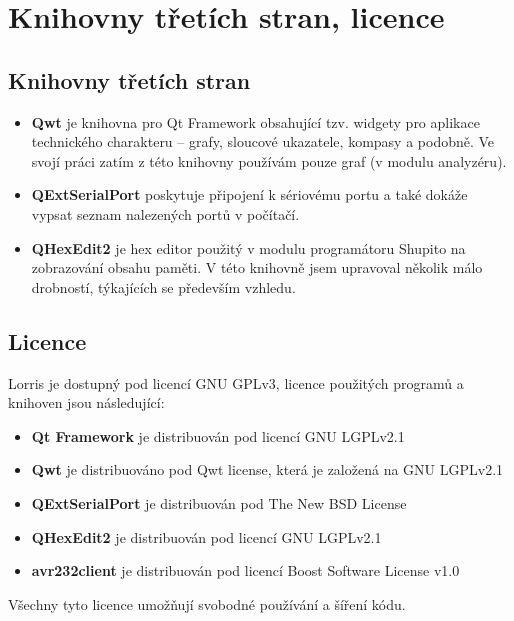 \documentclass[12pt, a4paper, oneside]{article}
\begin{document}
\newpage
\section{Knihovny třetích stran, licence}
\subsection{Knihovny třetích stran}
\begin{itemize}
    \item {\bf Qwt}\cite{qwt} je knihovna pro Qt Framework obsahující tzv. widgety pro aplikace technického charakteru -- grafy, sloucové ukazatele, kompasy a podobně. Ve svojí práci zatím z této knihovny používám pouze graf (v modulu analyzéru).
    \item {\bf QExtSerialPort}\cite{qext} poskytuje připojení k sériovému portu a také dokáže vypsat seznam nalezených portů v počítačí.
    \item {\bf QHexEdit2}\cite{qhex} je hex editor použitý v modulu programátoru Shupito na zobrazování obsahu paměti. V této knihovně jsem upravoval několik málo drobností, týkajících se především vzhledu.
\end{itemize}

\subsection{Licence}
Lorris je dostupný pod licencí GNU GPLv3\cite{gpl3}, licence použitých programů a knihoven jsou následující:
\begin{itemize}
    \item {\bf Qt Framework} je distribuován pod licencí GNU LGPLv2.1\cite{lgpl}
    \item {\bf Qwt} je distribuováno pod Qwt license\cite{qwtlicense}, která je založená na GNU LGPLv2.1
    \item {\bf QExtSerialPort} je distribuován pod The New BSD License\cite{newbsd}
    \item {\bf QHexEdit2} je distribuován pod licencí GNU LGPLv2.1
    \item {\bf avr232client} je distribuován pod licencí Boost Software License v1.0\cite{boost}
\end{itemize}

Všechny tyto licence umožňují svobodné používání a šíření kódu.
\end{document}
